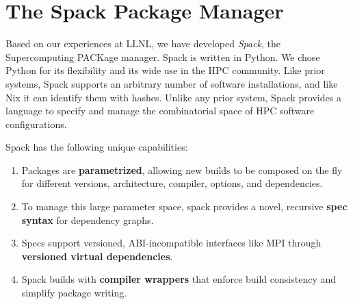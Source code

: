 
\section{The Spack Package Manager}
\label{sec:implementation}
Based on our experiences at LLNL, we have developed
{\it Spack}, the Supercomputing PACKage manager.
Spack is written in Python.  We chose Python for its flexibility
and its wide use in the HPC community.
%
Like prior systems, Spack supports an arbitrary number of software
installations, and like Nix it can identify them with hashes.  Unlike any
prior system, Spack provides a language to specify and manage the
combinatorial space of HPC software configurations.

\noindent
Spack has the following unique capabilities:
\begin{enumerate}
\item Packages are {\bf parametrized}, allowing new builds to be composed
      on the fly for different versions, architecture, compiler, options, 
      and dependencies.
\item To manage this large parameter space, spack provides a novel, 
      recursive {\bf spec syntax} for dependency graphs.
\item Specs support versioned, ABI-incompatible interfaces like MPI through
      {\bf versioned virtual dependencies}.
\item Spack builds with {\bf compiler wrappers} that enforce build
      consistency and simplify package writing.
\end{enumerate}









